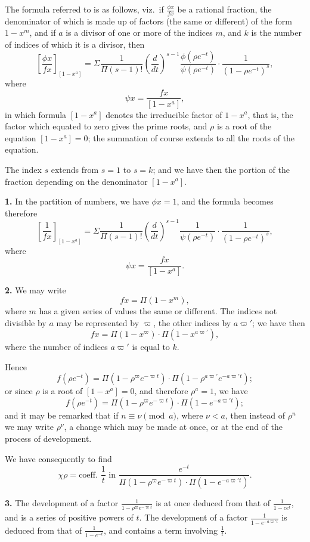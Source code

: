 \documentclass[12pt,a4paper]{article}
\theoremstyle{definition}
\begin{document}
The formula referred to is as follows, viz.\ if $\frac{\phi x}{fx}$ be a rational fraction, the denominator of which is made up of factors (the same or different) of the form $1-x^m$, and if $a$ is a divisor of one or more of the indices $m$, and $k$ is the number of indices of which it is a divisor, then
\[
\left[\frac{\phi x}{fx}\right]_{[1-x^a]}
= \Sigma \frac{1}{\Pi(s-1)!} \left(\frac{d}{dt}\right)^{s-1} \frac{\phi(\rho e^{-t})}{\psi(\rho e^{-t})} \cdot \frac{1}{(1-\rho e^{-t})^s},
\]
where
\[\psi x = \frac{fx}{[1-x^a]},\]
in which formula $[1-x^a]$ denotes the irreducible factor of $1-x^a$, that is, the factor which equated to zero gives the prime roots, and $\rho$ is a root of the equation $[1-x^a]=0$; the summation of course extends to all the roots of the equation.

The index $s$ extends from $s=1$ to $s=k$; and we have then the portion of the fraction depending on the denominator $[1-x^a]$.

\medskip
\noindent\textbf{1.} In the partition of numbers, we have $\phi x = 1$, and the formula becomes therefore
\[
\left[\frac{1}{fx}\right]_{[1-x^a]} = \Sigma \frac{1}{\Pi(s-1)!} \left(\frac{d}{dt}\right)^{s-1} \frac{1}{\psi(\rho e^{-t})} \cdot \frac{1}{(1-\rho e^{-t})^s},
\]
where
\[\psi x = \frac{fx}{[1-x^a]}.\]

\medskip
\noindent\textbf{2.} We may write
\[fx = \Pi(1-x^m),\]
where $m$ has a given series of values the same or different. The indices not divisible by $a$ may be represented by $\varpi$, the other indices by $a\varpi'$; we have then
\[fx = \Pi(1-x^{\varpi}) \cdot \Pi(1-x^{a\varpi'}),\]
where the number of indices $a\varpi'$ is equal to $k$.

Hence
\[f(\rho e^{-t}) = \Pi(1-\rho^{\varpi}e^{-\varpi t}) \cdot \Pi(1-\rho^{a\varpi'}e^{-a\varpi' t});\]
or since $\rho$ is a root of $[1-x^a]=0$, and therefore $\rho^a=1$, we have
\[f(\rho e^{-t}) = \Pi(1-\rho^{\varpi}e^{-\varpi t}) \cdot \Pi(1-e^{-a\varpi' t});\]
and it may be remarked that if $n \equiv \nu \pmod{a}$, where $\nu < a$, then instead of $\rho^n$ we may write $\rho^{\nu}$, a change which may be made at once, or at the end of the process of development.

We have consequently to find
\[\chi \rho = \text{coeff. } \frac{1}{t} \text{ in } \frac{e^{-t}}{\Pi(1-\rho^{\varpi}e^{-\varpi t}) \cdot \Pi(1-e^{-a\varpi' t})}.\]

\newpage

\medskip
\noindent\textbf{3.} The development of a factor $\frac{1}{1-\rho^{\varpi}e^{-\varpi t}}$ is at once deduced from that of $\frac{1}{1-ce^t}$, and is a series of positive powers of $t$. The development of a factor $\frac{1}{1-e^{-a\varpi' t}}$ is deduced from that of $\frac{1}{1-e^{-t}}$, and contains a term involving $\frac{1}{t}$.
\end{document}
